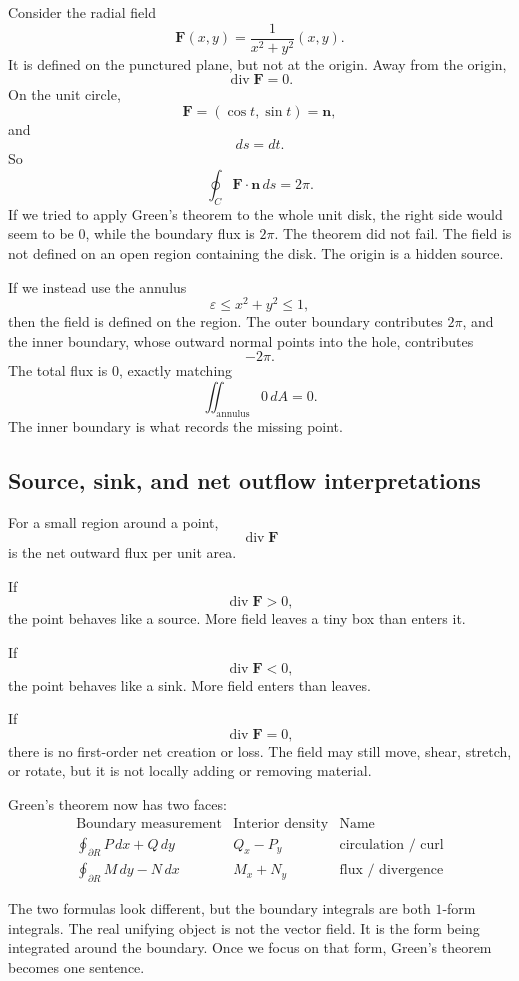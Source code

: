 Consider the radial field
\[
    \mathbf F(x,y)=\frac{1}{x^2+y^2}(x,y).
\]
It is defined on the punctured plane, but not at the origin.  Away from the origin,
\[
    \operatorname{div}\mathbf F=0.
\]
On the unit circle,
\[
    \mathbf F=(\cos t,\sin t)=\mathbf n,
\]
and
\[
    ds=dt.
\]
So
\[
\boxed{
    \oint_C \mathbf F\cdot\mathbf n\,ds=2\pi.
}
\]
If we tried to apply Green's theorem to the whole unit disk, the right side would seem
to be \(0\), while the boundary flux is \(2\pi\).  The theorem did not fail.  The field is
not defined on an open region containing the disk.  The origin is a hidden source.

If we instead use the annulus
\[
    \varepsilon\le x^2+y^2\le1,
\]
then the field is defined on the region.  The outer boundary contributes \(2\pi\), and
the inner boundary, whose outward normal points into the hole, contributes
\[
    -2\pi.
\]
The total flux is \(0\), exactly matching
\[
    \iint_{\text{annulus}}0\,dA=0.
\]
The inner boundary is what records the missing point.

\subsection{Source, sink, and net outflow interpretations}

For a small region around a point,
\[
    \operatorname{div}\mathbf F
\]
is the net outward flux per unit area.

If
\[
    \operatorname{div}\mathbf F>0,
\]
the point behaves like a source.  More field leaves a tiny box than enters it.

If
\[
    \operatorname{div}\mathbf F<0,
\]
the point behaves like a sink.  More field enters than leaves.

If
\[
    \operatorname{div}\mathbf F=0,
\]
there is no first-order net creation or loss.  The field may still move, shear, stretch,
or rotate, but it is not locally adding or removing material.

Green's theorem now has two faces:
\[
\begin{array}{c|c|c}
\text{Boundary measurement} & \text{Interior density} & \text{Name}\\ \hline
\displaystyle \oint_{\partial R} P\,dx+Q\,dy
&
\displaystyle Q_x-P_y
&
\text{circulation / curl}\\[3mm]
\displaystyle \oint_{\partial R} M\,dy-N\,dx
&
\displaystyle M_x+N_y
&
\text{flux / divergence}
\end{array}
\]

The two formulas look different, but the boundary integrals are both \(1\)-form
integrals.  The real unifying object is not the vector field.  It is the form being
integrated around the boundary.  Once we focus on that form, Green's theorem becomes
one sentence.


